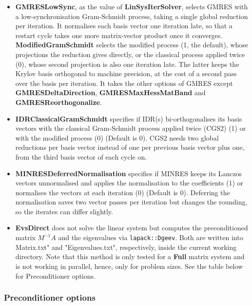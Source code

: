 \begin{itemize}
  process of GMRES is applied twice (1) or once (0) (Default is 0). The second
  pass recovers the orthogonality lost to rounding, at the cost of a second
  global reduction per iteration. It only applies when
  \textbf{ModifiedGramSchmidt} is 0.
\item \textbf{GMRESLowSync}, as the value of \textbf{LinSysIterSolver},
  selects GMRES with a low-synchronisation Gram-Schmidt process, taking a
  single global reduction per iteration. It normalises each basis vector one
  iteration late, so that a restart cycle takes one more matrix-vector product
  once it converges. \textbf{ModifiedGramSchmidt} selects the modified process
  (1, the default), whose projections the reduction gives directly, or the
  classical process applied twice (0), whose second projection is also one
  iteration late. The latter keeps the Krylov basis orthogonal to machine
  precision, at the cost of a second pass over the basis per iteration. It
  takes the other options of GMRES except \textbf{GMRESDeltaDirection},
  \textbf{GMRESMaxHessMatBand} and \textbf{GMRESReorthogonalize}.
\item \textbf{IDRClassicalGramSchmidt} specifies if IDR(s) bi-orthogonalises
  its basis vectors with the classical Gram-Schmidt process applied twice
  (CGS2) (1) or with the modified process (0) (Default is 0). CGS2 needs two
  global reductions per basis vector instead of one per previous basis vector
  plus one, from the third basis vector of each cycle on.
\item \textbf{MINRESDeferredNormalisation} specifies if MINRES keeps its
  Lanczos vectors unnormalised and applies the normalisation to the
  coefficients (1) or normalises the vectors at each iteration (0) (Default
  is 0). Deferring the normalisation saves two vector passes per iteration
  but changes the rounding, so the iterates can differ slightly.
\item \textbf{EvsDirect} does not solve the linear system but computes the preconditioned matrix $M^{-1}A$ and the eigenvalues via \verb!lapack::Dgeev!. Both are written into Matrix.txt" and "Eigenvalues.txt", respectively, inside the current working directory. Note that this method is only tested for a \textbf{Full} matrix system and is not working in parallel, hence, only for problem sizes. See the table below for Preconditioner options.
\end{itemize} 

\subsubsection{Preconditioner options}

